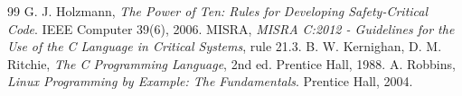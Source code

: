 \documentclass[11pt]{article}
\begin{document}
\begin{thebibliography}{99}
 G. J. Holzmann, \emph{The Power of Ten: Rules for Developing Safety-Critical Code}. IEEE Computer 39(6), 2006.
 MISRA, \emph{MISRA C:2012 - Guidelines for the Use of the C Language in Critical Systems}, rule 21.3.
 B. W. Kernighan, D. M. Ritchie, \emph{The C Programming Language}, 2nd ed. Prentice Hall, 1988.
 A. Robbins, \emph{Linux Programming by Example: The Fundamentals}. Prentice Hall, 2004.

\end{thebibliography}
\end{document}
